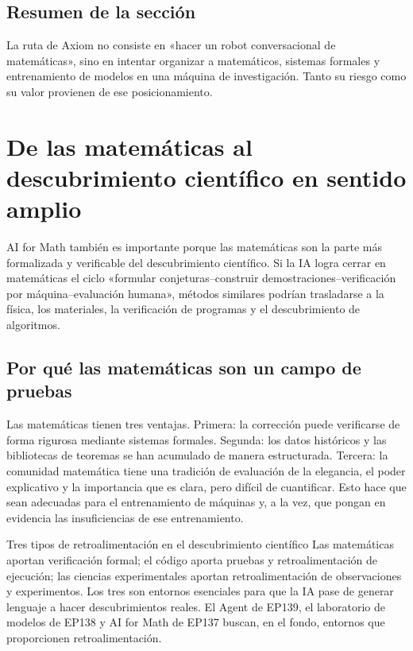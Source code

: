\documentclass[a4paper]{article}
\begin{document}
\subsection{Resumen de la sección}

La ruta de Axiom no consiste en «hacer un robot conversacional de matemáticas», sino en intentar organizar a matemáticos, sistemas formales y entrenamiento de modelos en una máquina de investigación. Tanto su riesgo como su valor provienen de ese posicionamiento.
\section{De las matemáticas al descubrimiento científico en sentido amplio}

AI for Math también es importante porque las matemáticas son la parte más formalizada y verificable del descubrimiento científico. Si la IA logra cerrar en matemáticas el ciclo «formular conjeturas--construir demostraciones--verificación por máquina--evaluación humana», métodos similares podrían trasladarse a la física, los materiales, la verificación de programas y el descubrimiento de algoritmos.

\subsection{Por qué las matemáticas son un campo de pruebas}

Las matemáticas tienen tres ventajas. Primera: la corrección puede verificarse de forma rigurosa mediante sistemas formales. Segunda: los datos históricos y las bibliotecas de teoremas se han acumulado de manera estructurada. Tercera: la comunidad matemática tiene una tradición de evaluación de la elegancia, el poder explicativo y la importancia que es clara, pero difícil de cuantificar. Esto hace que sean adecuadas para el entrenamiento de máquinas y, a la vez, que pongan en evidencia las insuficiencias de ese entrenamiento.

\begin{knowledgebox}{Tres tipos de retroalimentación en el descubrimiento científico}
Las matemáticas aportan verificación formal; el código aporta pruebas y retroalimentación de ejecución; las ciencias experimentales aportan retroalimentación de observaciones y experimentos. Los tres son entornos esenciales para que la IA pase de generar lenguaje a hacer descubrimientos reales. El Agent de EP139, el laboratorio de modelos de EP138 y AI for Math de EP137 buscan, en el fondo, entornos que proporcionen retroalimentación.
\end{knowledgebox}
\end{document}
